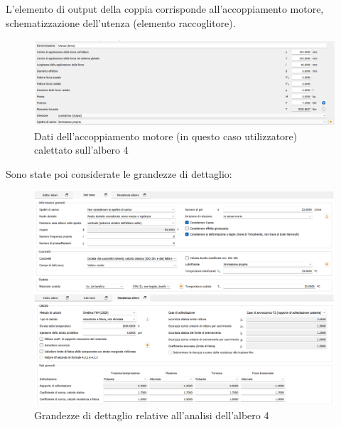 L'elemento di output  della coppia corrisponde all'accoppiamento motore, schematizzazione dell'utenza (elemento raccoglitore).
\begin{figure}[h]
    \centering
    \includegraphics[scale=0.6]{Immagini/MomentoAlbero4.png}
    \caption{Dati dell'accoppiamento motore (in questo caso utilizzatore) calettato sull'albero 4}
    \label{fig:MomentoAlbero4}
    \end{figure}
\newpage
Sono state poi considerate le grandezze di dettaglio:
\begin{figure}[h]
    \centering
    \includegraphics[scale=0.6]{Immagini/DettagliAlbero4.png}
    \caption{Grandezze di dettaglio relative all'analisi dell'albero 4}
    \label{fig:DettagliAlbero4}
\end{figure}


